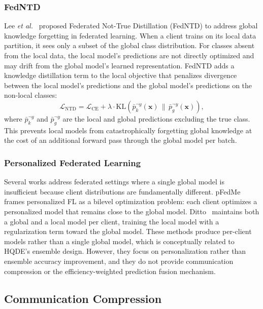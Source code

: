 \documentclass[journal,twoside]{IEEEtran}
\newcommand{\hqde}{\mbox{HQDE}\xspace}
\newcommand{\etal}{\textit{et al.}\xspace}
\begin{document}
\subsubsection{FedNTD}

Lee \etal~\cite{lee2022fedndt} proposed Federated Not-True Distillation
(FedNTD) to address global knowledge forgetting in federated learning.
When a client trains on its local data partition, it sees only a
subset of the global class distribution. For classes absent from the
local data, the local model's predictions are not directly optimized
and may drift from the global model's learned representation. FedNTD
adds a knowledge distillation term to the local objective that penalizes
divergence between the local model's predictions and the global model's
predictions on the non-local classes:
\begin{equation}
  \mathcal{L}_{\text{NTD}} = \mathcal{L}_{\text{CE}} + \lambda
  \cdot \mathrm{KL}\!\left(\bar{p}_k^{\neg y}(\mathbf{x}) \,\|\,
  \bar{p}_g^{\neg y}(\mathbf{x})\right),
  \label{eq:fedndt}
\end{equation}
where $\bar{p}_k^{\neg y}$ and $\bar{p}_g^{\neg y}$ are the local and
global predictions excluding the true class. This prevents local
models from catastrophically forgetting global knowledge at the cost
of an additional forward pass through the global model per batch.

\subsubsection{Personalized Federated Learning}

Several works address federated settings where a single global model
is insufficient because client distributions are fundamentally different.
pFedMe~\cite{dinh2020pfedme} frames personalized FL as a bilevel
optimization problem: each client optimizes a personalized model that
remains close to the global model. Ditto~\cite{li2021ditto} maintains
both a global and a local model per client, training the local model
with a regularization term toward the global model. These methods
produce per-client models rather than a single global model, which is
conceptually related to \hqde{}'s ensemble design. However, they focus
on personalization rather than ensemble accuracy improvement, and they
do not provide communication compression or the efficiency-weighted
prediction fusion mechanism.

\subsection{Communication Compression}
\end{document}
